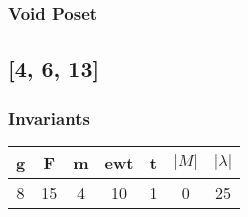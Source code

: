 \documentclass[a4paper]{article}
\begin{document}
\hfill\begin{minipage}{0.48\textwidth}
\subsubsection*{Void Poset}
\centering
\end{minipage}
\newpage\subsection{[4, 6, 13]}
\noindent\begin{minipage}{0.6\textwidth}
\subsubsection*{Invariants}
\centering
\begin{tabular}{|c|c|c|c|c|c|c|}
\toprule
g & F & m & ewt & t & \(|M|\) & \(|\lambda|\) \\
\midrule
8 & 15 & 4 & 10 & 1 & 0 & 25 \\
\bottomrule
\end{tabular}
\end{minipage}%
\end{document}
